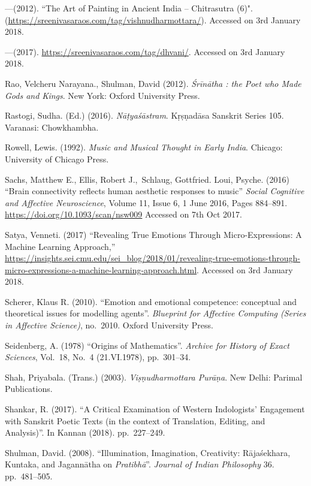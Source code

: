 \begin{thebibliography}{99}
---\kern3pt(2012). ``The Art of Painting in Ancient India -- Chitrasutra (6)". (\url{https://sreenivasaraos.com/tag/vishnudharmottara/}). Accessed on 3rd January 2018.

---\kern3pt(2017). \url{https://sreenivasaraos.com/tag/dhvani/}. Accessed on 3rd January 2018.

Rao, Velcheru Narayana., Shulman, David (2012). \textsl{Śrīnātha : the Poet who Made Gods and Kings}. New York: Oxford University Press.

Rastogi, Sudha. (Ed.) (2016). \textsl{Nāṭyaśāstram}. Kṛṣṇadāsa Sanskrit Series 105. Varanasi: Chowkhambha.

Rowell, Lewis. (1992). \textsl{Music and Musical Thought in Early India}. Chicago: University of Chicago Press.

Sachs, Matthew E., Ellis, Robert J., Schlaug, Gottfried. Loui, Psyche. (2016) “Brain connectivity reflects human aesthetic responses to music” \textsl{Social Cognitive and Affective Neuroscience}, Volume 11, Issue 6, 1 June 2016, Pages 884--891. \url{https://doi.org/10.1093/scan/nsw009} Accessed on 7th Oct 2017.

Satya, Venneti. (2017) “Revealing True Emotions Through Micro-Expressions: A Machine Learning Approach,” \url{https://insights.sei.cmu.edu/sei_blog/2018/01/revealing-true-emotions-through-micro-expressions-a-machine-learning-approach.html}. Accessed on 3rd January 2018.

Scherer, Klaus R. (2010). “Emotion and emotional competence: conceptual and theoretical issues for modelling agents”. \textsl{Blueprint for Affective Computing (Series in Affective Science)}, no.~2010. Oxford University Press.

Seidenberg, A. (1978) “Origins of Mathematics”. \textsl{Archive for History of Exact Sciences}, Vol.~18, No.~4 (21.VI.1978), pp.~301--34.

Shah, Priyabala. (Trans.) (2003). \textsl{Viṣṇudharmottara Purāṇa}. New Delhi: Parimal Publications.

Shankar, R. (2017). “A Critical Examination of Western Indologists’ Engagement with Sanskrit Poetic Texts (in the context of Translation, Editing, and Analysis)”. In Kannan (2018). pp.~227--249.

Shulman, David. (2008). “Illumination, Imagination, Creativity: Rājaśekhara, Kuntaka, and Jagannātha on \textsl{Pratibhā}”.  \textsl{Journal of Indian Philosophy} 36. pp.~481--505.


\end{thebibliography}

